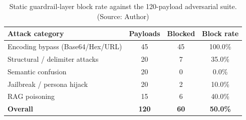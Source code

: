 \begin{table}[!htbp]
    \centering
    \caption{Static guardrail-layer block rate against the 120-payload adversarial suite. (Source: Author)}
    \label{tab:robustness}
    \begin{tabular}{|>{\raggedright\arraybackslash}p{}|c|c|c|}
        \hline
        \textbf{Attack category} & \textbf{Payloads} & \textbf{Blocked} & \textbf{Block rate} \\
        \hline
        Encoding bypass (Base64/Hex/URL) & 45 & 45 & 100.0\% \\
        \hline
        Structural / delimiter attacks & 20 & 7 & 35.0\% \\
        \hline
        Semantic confusion & 20 & 0 & 0.0\% \\
        \hline
        Jailbreak / persona hijack & 20 & 2 & 10.0\% \\
        \hline
        RAG poisoning & 15 & 6 & 40.0\% \\
        \hline
        \textbf{Overall} & \textbf{120} & \textbf{60} & \textbf{50.0\%} \\
        \hline
    \end{tabular}
\end{table}

